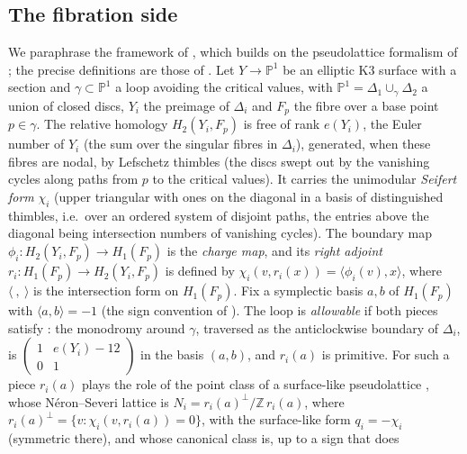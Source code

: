 \documentclass[11pt]{article}
\newcommand{\Z}{\mathbb Z}
\newcommand{\PP}{\mathbb P}
\theoremstyle{definition}
\theoremstyle{remark}
\begin{document}
\subsection{The fibration side}\label{sec:fibside}


We paraphrase the framework of \cite[\S\S2,4,5]{GT}, which builds on
the pseudolattice formalism of \cite{Kuz,HT}; the precise definitions
are those of \cite{GT}. Let \(Y\to\PP^1\) be an elliptic K3 surface
with a section and \(\gamma\subset\PP^1\) a loop avoiding the critical
values, with \(\PP^1=\Delta_1\cup_\gamma\Delta_2\) a union of closed
discs, \(Y_i\) the preimage of \(\Delta_i\) and \(F_p\) the fibre over
a base point \(p\in\gamma\). The relative homology \(H_2(Y_i,F_p)\) is
free of rank \(e(Y_i)\), the Euler number of \(Y_i\) (the sum over the
singular fibres in \(\Delta_i\)), generated, when these fibres are nodal,
by Lefschetz thimbles (the discs swept out by the vanishing cycles
along paths from \(p\) to the critical values). It carries the
unimodular \emph{Seifert form} \(\chi_i\) (upper triangular with ones
on the diagonal in a basis of distinguished thimbles, i.e.\ over an
ordered system of disjoint paths, the entries above the diagonal being
intersection numbers of vanishing cycles). The boundary map
\(\phi_i\colon H_2(Y_i,F_p)\to H_1(F_p)\) is the \emph{charge map}, and
its \emph{right adjoint} \(r_i\colon H_1(F_p)\to H_2(Y_i,F_p)\) is
defined by \(\chi_i(v,r_i(x))=\langle\phi_i(v),x\rangle\), where
\(\langle\ ,\ \rangle\) is the intersection form on \(H_1(F_p)\). Fix a
symplectic basis \(a,b\) of \(H_1(F_p)\) with \(\langle a,b\rangle=-1\)
(the sign convention of \cite{GT}). The loop is \emph{allowable}
\cite[Definition~4.11]{GT} if both pieces satisfy
\cite[Assumption~4.9]{GT}: the monodromy around \(\gamma\), traversed
as the anticlockwise boundary of \(\Delta_i\), is
\(\left(\begin{smallmatrix}1&e(Y_i)-12\\0&1\end{smallmatrix}\right)\)
in the basis \((a,b)\), and \(r_i(a)\) is primitive. For such a piece
\(r_i(a)\) plays the role of the point class of a surface-like
pseudolattice \cite[\S\S2,4]{GT}, whose N\'eron--Severi lattice is
\(N_i=r_i(a)^\perp/\Z\,r_i(a)\), where
\(r_i(a)^\perp=\{v:\chi_i(v,r_i(a))=0\}\), with the surface-like form
\(q_i=-\chi_i\) (symmetric there), and whose canonical class is, up to a sign that does
\end{document}
